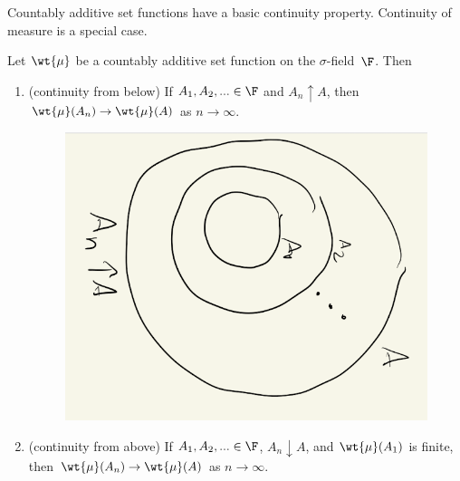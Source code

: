 \documentclass{article} %
\renewcommand{\sf}{$\sigma$-field}
\newcommand{\signedmu}{\wt{\mu}}
\newenvironment{alphabate}
    {\begin{enumerate}[label=\alph*)]}
	{\end{enumerate} }
\begin{document}
Countably additive set functions have a basic continuity property. Continuity of measure is a special case. 

\begin{theorem}
Let $\signedmu$ be a countably additive set function on the \sf\ $\F$. Then

\begin{alphabate}
\item (continuity from below) If $A_1, A_2, ... \in \F$ and $A_n \uparrow A$, then $\signedmu(A_n) \to \signedmu(A)$ as $n \to \infty$.

\begin{figure}[H]
 \centering
\includegraphics[width=.2\textwidth, angle=90]{images/increasing_sequence_of_sets}	
 \end{figure}
   
\item (continuity from above)  If $A_1, A_2, ... \in \F$, $A_n \downarrow A$, and $\signedmu(A_1)$ is finite, then $\signedmu(A_n) \to \signedmu(A)$ as $n \to \infty$. 
\end{alphabate}
\label{thm:continuity_of_countably_additive_set_functions}
\end{theorem}
\end{document}
